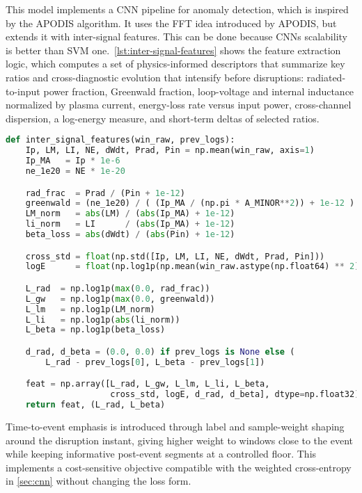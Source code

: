 This model implements a \ac{CNN} pipeline for anomaly detection, which is inspired by the \ac{APODIS} algorithm. It uses the \ac{FFT} idea introduced by \ac{APODIS}, but extends it with inter-signal features. This can be done because \ac{CNN}s scalability is better than SVM one.\ \autoref{lst:inter-signal-features} shows the feature extraction logic, which computes a set of physics-informed descriptors that summarize key ratios and cross-diagnostic evolution that intensify before disruptions: radiated-to-input power fraction, Greenwald fraction, loop-voltage and internal inductance normalized by plasma current, energy-loss rate versus input power, cross-channel dispersion, a log-energy measure, and short-term deltas of selected ratios.

\begin{lstlisting}[language=Python, caption={Inter-signal feature vector used for early coupling and trend capture.}, label={lst:inter-signal-features}]
def inter_signal_features(win_raw, prev_logs):
    Ip, LM, LI, NE, dWdt, Prad, Pin = np.mean(win_raw, axis=1)
    Ip_MA   = Ip * 1e-6
    ne_1e20 = NE * 1e-20

    rad_frac  = Prad / (Pin + 1e-12)
    greenwald = (ne_1e20) / ( (Ip_MA / (np.pi * A_MINOR**2)) + 1e-12 )
    LM_norm   = abs(LM) / (abs(Ip_MA) + 1e-12)
    li_norm   = LI      / (abs(Ip_MA) + 1e-12)
    beta_loss = abs(dWdt) / (abs(Pin) + 1e-12)

    cross_std = float(np.std([Ip, LM, LI, NE, dWdt, Prad, Pin]))
    logE      = float(np.log1p(np.mean(win_raw.astype(np.float64) ** 2)))

    L_rad  = np.log1p(max(0.0, rad_frac))
    L_gw   = np.log1p(max(0.0, greenwald))
    L_lm   = np.log1p(LM_norm)
    L_li   = np.log1p(abs(li_norm))
    L_beta = np.log1p(beta_loss)

    d_rad, d_beta = (0.0, 0.0) if prev_logs is None else (
        L_rad - prev_logs[0], L_beta - prev_logs[1])

    feat = np.array([L_rad, L_gw, L_lm, L_li, L_beta,
                     cross_std, logE, d_rad, d_beta], dtype=np.float32)
    return feat, (L_rad, L_beta)
\end{lstlisting}

Time-to-event emphasis is introduced through label and sample-weight shaping around the disruption instant, giving higher weight to windows close to the event while keeping informative post-event segments at a controlled floor. This implements a cost-sensitive objective compatible with the weighted cross-entropy in \autoref{sec:cnn} without changing the loss form.

